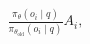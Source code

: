 \documentclass[preview]{standalone}
\begin{document}
\begin{align*}
\frac{\pi_\theta(o_i \mid q)}{\pi_{\theta_{\text{old}}}(o_i \mid q)} A_i,
\end{align*}
\end{document}

